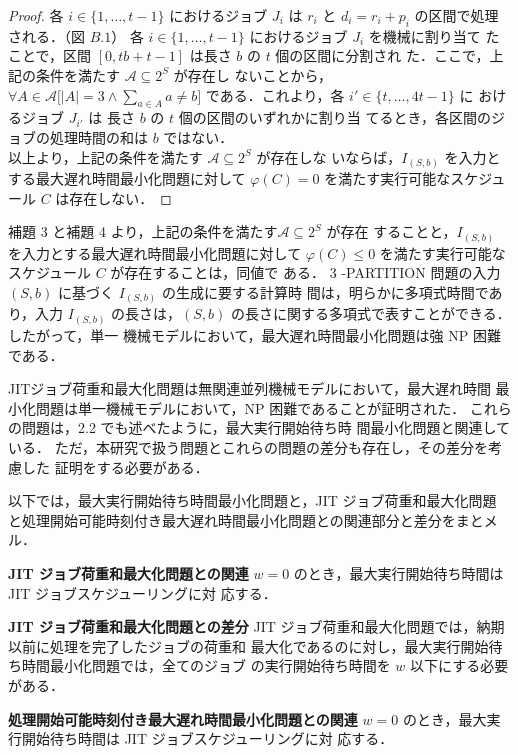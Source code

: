 \documentclass[12pt]{optlab-bachelor}
\begin{document}
\begin{proof}
  各 $i \in \{1,\ldots,t - 1\}$ におけるジョブ $J_i$ は $r_i$ と $d_i =
  r_i + p_i$ の区間で処理される．（図 $B.1$）
  各 $i \in \{1,\ldots,t - 1\}$ におけるジョブ $J_i$ を機械に割り当て
  たことで，区間 $[0,tb + t - 1]$ は長さ $b$ の $t$ 個の区間に分割され
  た．ここで，上記の条件を満たす $\mathcal{A} \subseteq 2^S$ が存在し
  ないことから，$\forall A \in \mathcal{A}\big[|A| = 3 \land \sum_{a \in
    A}a \neq b \big]$ である．これより，各 $i' \in \{t,\ldots,4t - 1\}$ に
  おけるジョブ $J_{i'}$ は 長さ $b$ の $t$ 個の区間のいずれかに割り当
  てるとき，各区間のジョブの処理時間の和は $b$ ではない．\\
  以上より，上記の条件を満たす $\mathcal{A} \subseteq 2^S$ が存在しな
  いならば，$I_{(S,b)}$ を入力とする最大遅れ時間最小化問題に対して
  $\varphi(C) = 0$ を満たす実行可能なスケジュール $C$ は存在しない．
\end{proof}

補題 3 と補題 4 より，上記の条件を満たす$\mathcal{A} \subseteq 2^S$ が存在
することと，$I_{(S,b)}$ を入力とする最大遅れ時間最小化問題に対して
$\varphi(C) \le  0$
を満たす実行可能なスケジュール $C$ が存在することは，同値で
ある．
3 -PARTITION 問題の入力 $(S,b)$ に基づく $I_{(S,b)}$ の生成に要する計算時
間は，明らかに多項式時間であり，入力 $I_{(S,b)}$ の長さは，$(S, b)$
の長さに関する多項式で表すことができる．したがって，単一
機械モデルにおいて，最大遅れ時間最小化問題は強 NP 困難である．

JITジョブ荷重和最大化問題は無関連並列機械モデルにおいて，最大遅れ時間
最小化問題は単一機械モデルにおいて，NP 困難であることが証明された．
これらの問題は，2.2 でも述べたように，最大実行開始待ち時
間最小化問題と関連している．
ただ，本研究で扱う問題とこれらの問題の差分も存在し，その差分を考慮した
証明をする必要がある．

以下では，最大実行開始待ち時間最小化問題と，JIT ジョブ荷重和最大化問題
と処理開始可能時刻付き最大遅れ時間最小化問題との関連部分と差分をまとメ
ル．

\textbf{JIT ジョブ荷重和最大化問題との関連}
$w = 0$ のとき，最大実行開始待ち時間は JIT ジョブスケジューリングに対
応する．

\textbf{JIT ジョブ荷重和最大化問題との差分}
JIT ジョブ荷重和最大化問題では，納期以前に処理を完了したジョブの荷重和
最大化であるのに対し，最大実行開始待ち時間最小化問題では，全てのジョブ
の実行開始待ち時間を $w$ 以下にする必要がある．

\textbf{処理開始可能時刻付き最大遅れ時間最小化問題との関連}
$w = 0$ のとき，最大実行開始待ち時間は JIT ジョブスケジューリングに対
応する．
\end{document}
